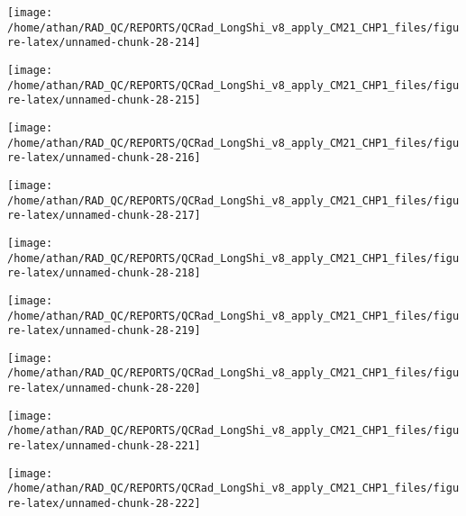 \documentclass[
  10pt,
  a4paper,oneside]{article}
\begin{document}
\begin{center}\texttt{[image: /home/athan/RAD\_QC/REPORTS/QCRad\_LongShi\_v8\_apply\_CM21\_CHP1\_files/figure-latex/unnamed-chunk-28-214]} \end{center}

\begin{center}\texttt{[image: /home/athan/RAD\_QC/REPORTS/QCRad\_LongShi\_v8\_apply\_CM21\_CHP1\_files/figure-latex/unnamed-chunk-28-215]} \end{center}

\begin{center}\texttt{[image: /home/athan/RAD\_QC/REPORTS/QCRad\_LongShi\_v8\_apply\_CM21\_CHP1\_files/figure-latex/unnamed-chunk-28-216]} \end{center}

\begin{center}\texttt{[image: /home/athan/RAD\_QC/REPORTS/QCRad\_LongShi\_v8\_apply\_CM21\_CHP1\_files/figure-latex/unnamed-chunk-28-217]} \end{center}

\begin{center}\texttt{[image: /home/athan/RAD\_QC/REPORTS/QCRad\_LongShi\_v8\_apply\_CM21\_CHP1\_files/figure-latex/unnamed-chunk-28-218]} \end{center}

\begin{center}\texttt{[image: /home/athan/RAD\_QC/REPORTS/QCRad\_LongShi\_v8\_apply\_CM21\_CHP1\_files/figure-latex/unnamed-chunk-28-219]} \end{center}

\begin{center}\texttt{[image: /home/athan/RAD\_QC/REPORTS/QCRad\_LongShi\_v8\_apply\_CM21\_CHP1\_files/figure-latex/unnamed-chunk-28-220]} \end{center}

\begin{center}\texttt{[image: /home/athan/RAD\_QC/REPORTS/QCRad\_LongShi\_v8\_apply\_CM21\_CHP1\_files/figure-latex/unnamed-chunk-28-221]} \end{center}

\begin{center}\texttt{[image: /home/athan/RAD\_QC/REPORTS/QCRad\_LongShi\_v8\_apply\_CM21\_CHP1\_files/figure-latex/unnamed-chunk-28-222]} \end{center}
\end{document}
